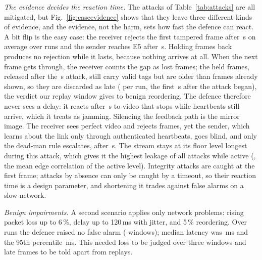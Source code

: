 \textit{The evidence decides the reaction time.} The attacks of Table~\ref{tab:attacks} are all mitigated, but Fig.~\ref{fig:caseevidence} shows that they leave three different kinds of evidence, and the evidence, not the harm, sets how fast the defence can react. A bit flip is the easy case: the receiver rejects the first tampered frame after \CaseBitflipFirstRej\,s on average over \CaseRuns{} runs and the sender reaches E5 after \CaseBitflipAware\,s. Holding frames back produces no rejection while it lasts, because nothing arrives at all. When the next frame gets through, the receiver counts the gap as lost frames; the held frames, released after the \CaseDelayDuration\,s attack, still carry valid tags but are older than frames already shown, so they are discarded as late (\CaseDelayRejected{} per run, the first \CaseDelayFirstRej\,s after the attack began), the verdict our replay window gives to benign reordering. The defence therefore never sees a delay: it reacts after \CaseDelayAware\,s to video that stops while heartbeats still arrive, which it treats as jamming. Silencing the feedback path is the mirror image. The receiver sees perfect video and rejects \CaseFbdropRejected{} frames, yet the sender, which learns about the link only through authenticated heartbeats, goes blind, and only the dead-man rule escalates, after \CaseFbdropAware\,s. The stream stays at its floor level longest during this attack, which gives it the highest leakage of all attacks while active (\CaseFbdropLeak, the mean edge correlation of the active level). Integrity attacks are caught at the first frame; attacks by absence can only be caught by a timeout, so their reaction time is a design parameter, and shortening it trades against false alarms on a slow network.

\textit{Benign impairments.} A second scenario applies only network problems: rising packet loss up to 6\,\%, delay up to 120\,ms with jitter, and 5\,\% reordering. Over \BenignRuns{} runs the defence raised no false alarm (\BenignFalse{} windows); median latency was \BenignLatency\,ms and the 95th percentile \BenignPninetyfive\,ms. This needed loss to be judged over three windows and late frames to be told apart from replays.

